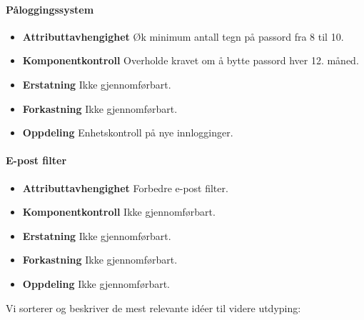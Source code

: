 \paragraph{Påloggingssystem}
\begin{itemize}
    \item \textbf{Attributtavhengighet} Øk minimum antall tegn på passord fra 8 til 10. 
    \item \textbf{Komponentkontroll} Overholde kravet om å bytte passord hver 12. måned.
    \item \textbf{Erstatning} Ikke gjennomførbart. 
    \item \textbf{Forkastning} Ikke gjennomførbart. 
    \item \textbf{Oppdeling} Enhetskontroll på nye innlogginger.
\end{itemize}

\paragraph{E-post filter}
\begin{itemize}
    \item \textbf{Attributtavhengighet} Forbedre e-post filter.
    \item \textbf{Komponentkontroll} Ikke gjennomførbart. 
    \item \textbf{Erstatning} Ikke gjennomførbart. 
    \item \textbf{Forkastning} Ikke gjennomførbart. 
    \item \textbf{Oppdeling} Ikke gjennomførbart. 
\end{itemize}

Vi sorterer og beskriver de mest relevante idéer til videre utdyping:

